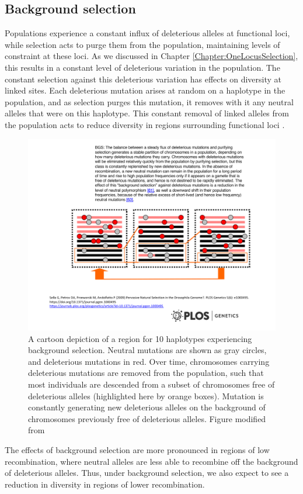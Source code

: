 \subsection{Background selection}

Populations experience a constant influx of
deleterious alleles at functional loci, while selection acts to purge
them from the population, maintaining levels of constraint at these loci. As
we discussed in Chapter \ref{Chapter:OneLocusSelection}, this results
in a constant level of deleterious variation in the population. The
constant selection against this deleterious variation has effects on diversity at linked
sites. Each deleterious mutation arises at random on a haplotype in the
population, and as selection purges this mutation, it removes with it any neutral alleles that were on this
haplotype. This constant removal of linked alleles from the population
acts to reduce diversity in regions surrounding functional loci \citep{Hudson:95b,Nordborg:96}. 

\begin{figure}
\begin{center}
\includegraphics[width=0.75 \textwidth]{figures/Hitchhiking/BGS_cartoon.pdf}
\end{center}
\caption{A cartoon depiction of a region for 10 haplotypes
  experiencing background selection. Neutral mutations are shown as
  gray circles, and deleterious mutations in red. Over time,
  chromosomes carrying deleterious mutations are removed from the
  population, such that most individuals are descended from a subset of
  chromosomes free of deleterious alleles (highlighted here by orange boxes). Mutation is constantly generating new deleterious alleles on
  the background of chromosomes previously free of deleterious
  alleles. Figure modified from \citet{sella2009pervasive}} \label{fig:BGS_cartoon}
\end{figure}
The effects of background selection are more pronounced in regions of low recombination, where
neutral alleles are less able to recombine off the background of deleterious
alleles. Thus, under background selection, we also expect to see a
reduction in diversity in regions of lower recombination. 


